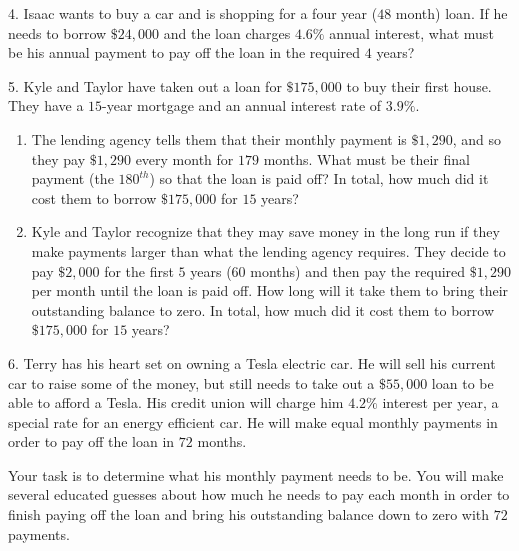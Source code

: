 \documentclass[10pt,]{book}
\theoremstyle{plain}
\theoremstyle{definition}
\theoremstyle{definition}
\theoremstyle{definition}
\numberwithin{equation}{section}
\begin{document}
\begin{exerciselist}
\par\smallskip
\item[4.]\hypertarget{exercise-15}{}\hypertarget{p-63}{}%
Isaac wants to buy a car and is shopping for a four year (\(48\) month) loan. If he needs to borrow \(\$24,000\) and the loan charges \(4.6\%\) annual interest, what must be his annual payment to pay off the loan in the required \(4\) years?%
\par\smallskip
\item[5.]\hypertarget{exercise-16}{}\hypertarget{p-64}{}%
Kyle and Taylor have taken out a loan for \(\$175,000\) to buy their first house. They have a \(15\)-year mortgage and an annual interest rate of \(3.9\%\).%
\leavevmode%
\begin{enumerate}[label=(\alph*)]
\item\hypertarget{li-52}{}The lending agency tells them that their monthly payment is \(\$1,290\), and so they pay \(\$1,290\) every month for \(179\) months. What must be their final payment (the \(180^{th}\)) so that the loan is paid off?  In total, how much did it cost them to borrow \(\$175,000\) for \(15\) years?%
\item\hypertarget{li-53}{}Kyle and Taylor recognize that they may save money in the long run if they make payments larger than what the lending agency requires. They decide to pay \(\$2,000\) for the first \(5\) years (\(60\) months) and then pay the required \(\$1,290\) per month until the loan is paid off. How long will it take them to bring their outstanding balance to zero. In total, how much did it cost them to borrow \(\$175,000\) for \(15\) years?%
\end{enumerate}
\par\smallskip
\item[6.]\hypertarget{exercise-17}{}\hypertarget{p-65}{}%
Terry has his heart set on owning a Tesla electric car. He will sell his current car to raise some of the money, but still needs to take out a \(\$55,000\) loan to be able to afford a Tesla. His credit union will charge him \(4.2\%\) interest per year, a special rate for an energy efficient car. He will make equal monthly payments in order to pay off the loan in \(72\) months.%
\par
\hypertarget{p-66}{}%
Your task is to determine what his monthly payment needs to be. You will make several educated guesses about how much he needs to pay each month in order to finish paying off the loan and bring his outstanding balance down to zero with \(72\) payments.%
\leavevmode%
\begin{enumerate}[label=(\alph*)]

\end{enumerate}
\end{exerciselist}
\end{document}

